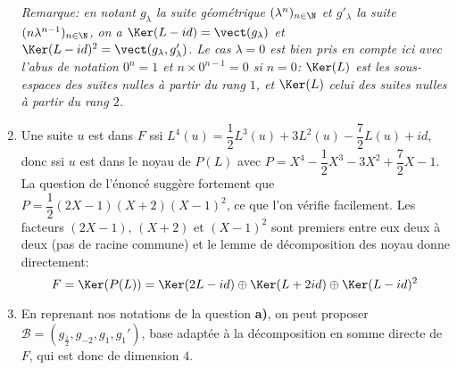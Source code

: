 \begin{enonce}
\begin{solution}
\begin{enumerate}
   {\itshape Remarque: en notant  $g_{\lambda}$ la suite géométrique
     $(\lambda^n)_{n\in\N}$ et $g'_{\lambda}$ la suite
     $(n\lambda^{n-1})_{n\in\N}$, on a
     $\Ker(L-id)=\vect(g_\lambda)$ et $\Ker(L-id)^2=\vect(g_\lambda,
     g'_{\lambda})$. Le cas $\lambda=0$ est bien pris en compte ici
     avec l'abus de notation $0^n=1$ et $n\times 0^{n-1}=0$ si
     $n=0$: $\Ker(L)$ 
     est les sous-espaces des suites nulles à partir du rang $1$, et
     $\Ker(L)$ celui des suites nulles à partir du rang $2$.
     }
   \item Une suite $u$ est dans $F$ ssi
     $L^4(u)=\dfrac12L^3(u)+3L^2(u)-\dfrac72L(u)+id$, donc ssi $u$ est
     dans le noyau de $P(L)$ avec
     $P=X^4-\dfrac12X^3-3X^2+\dfrac72X-1$. La question de l'énoncé
     suggère fortement que
     $P=\dfrac12(2X-1)(X+2)(X-1)^2$, ce que l'on vérifie
     facilement. Les facteurs $(2X-1)$, $(X+2)$ et $(X-1)^2$ sont
     premiers entre eux deux à deux (pas de racine commune) et le
     lemme de décomposition des noyau donne directement:
     \[F=\Ker(P(L))=\Ker(2L-id)\oplus\Ker(L+2id)\oplus\Ker(L-id)^2\]
   \item En reprenant nos notations de la question \textbf{a)}, on
     peut proposer $\mathcal{B}=(g_{\frac12}, g_{-2}, g_1,g_1')$, base
     adaptée à la décomposition en somme directe de $F$, qui est donc
     de dimension $4$.
  \end{enumerate}
\end{solution}
\end{enonce}